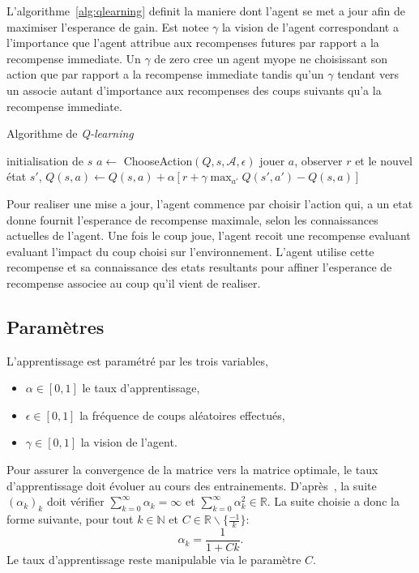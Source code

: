 \documentclass{report}
\newcommand{\R}{\mathbb{R}}
\begin{document}
L'algorithme~\ref{alg:qlearning} definit la maniere dont l'agent se met a jour
afin de maximiser l'esperance de gain. Est notee \(\gamma\) la vision de
l'agent correspondant a l'importance que l'agent attribue aux recompenses
futures par rapport a la recompense immediate. Un \(\gamma\) de zero cree un
agent myope ne choisissant son action que par rapport a la recompense immediate
tandis qu'un \(\gamma\) tendant vers un associe autant d'importance aux
recompenses des coups suivants qu'a la recompense immediate.
\begin{algorithm}
  \caption{Algorithme de \textit{Q-learning}}\label{alg:qlearning}
  \begin{algorithmic}
    [1]
    \Repeat{}
    \State{} initialisation de \(s\)
    \Repeat{}
    \State{} \(a \gets\) ChooseAction$(Q, s, \mathcal{A}, \epsilon)$
    \State{} jouer \(a\), observer \(r\) et le nouvel \'etat \(s'\),
    \State{} \(Q(s, a) \gets Q(s, a) + \alpha\left[ r + \gamma \max_{a'}
      Q(s', a') - Q(s, a)\right]\)
    \EndProcedure{}
  \end{algorithmic}
\end{algorithm}

Pour realiser une mise a jour, l'agent commence par choisir l'action qui, a un
etat donne fournit l'esperance de recompense maximale, selon les connaissances
actuelles de l'agent. Une fois le coup joue, l'agent recoit une recompense
evaluant evaluant l'impact du coup choisi sur l'environnement. L'agent utilise
cette recompense et sa connaissance des etats resultants pour affiner
l'esperance de recompense associee au coup qu'il vient de realiser.

\subsection{Paramètres}
L'apprentissage est paramétré par les trois variables,
\begin{itemize}
  \item \(\alpha \in [0, 1]\) le taux d'apprentissage,
  \item \(\epsilon \in [0, 1]\) la fréquence de coups aléatoires effectués,
  \item \(\gamma \in [0, 1]\) la vision de l'agent.
\end{itemize}
Pour assurer la convergence de la matrice vers la matrice optimale,
le taux d'apprentissage doit évoluer au cours des entrainements.
D'après~\cite{watkins92}, la suite \( (\alpha_k)_k \) doit vérifier
\( \sum_{k=0}^\infty \alpha_k = \infty \) et \(
\sum_{k=0}^\infty \alpha_k^2 \in \R \). La suite choisie a donc la forme
suivante, pour tout \( k \in \mathbb{N} \) et
\( C \in \R \backslash \{ \frac{-1}{k} \} \):
\[
  \alpha_k = \frac{1}{1 + Ck}.
\]
Le taux d'apprentissage reste manipulable via le paramètre \( C \).
\end{document}
